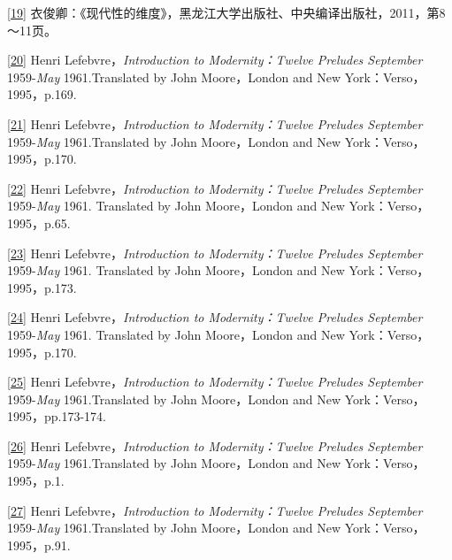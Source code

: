 \documentclass[UTF8, fontset = sourcesans, a4paper, oneside, zihao =
-4, scheme=chinese, no-math, space=true]{ctexbook}
\begin{document}
\protect\hypertarget{part0005_split_003.htmlux5cux23m19}{}{}\protect\hyperlink{part0005_split_002.htmlux5cux23w19}{{[}19{]}}
衣俊卿：《现代性的维度》，黑龙江大学出版社、中央编译出版社，2011，第8～11页。

\protect\hypertarget{part0005_split_003.htmlux5cux23m20}{}{}\protect\hyperlink{part0005_split_002.htmlux5cux23w20}{{[}20{]}}
Henri Lefebvre，\emph{Introduction to Modernity：Twelve Preludes
September} 1959-\emph{May} 1961.Translated by John Moore，London and New
York：Verso，1995，p.169.

\protect\hypertarget{part0005_split_003.htmlux5cux23m21}{}{}\protect\hyperlink{part0005_split_002.htmlux5cux23w21}{{[}21{]}}
Henri Lefebvre，\emph{Introduction to Modernity：Twelve Preludes
September} 1959-\emph{May} 1961.Translated by John Moore，London and New
York：Verso，1995，p.170.

\protect\hypertarget{part0005_split_003.htmlux5cux23m22}{}{}\protect\hyperlink{part0005_split_002.htmlux5cux23w22}{{[}22{]}}
Henri Lefebvre，\emph{Introduction to Modernity：Twelve Preludes
September} 1959-\emph{May} 1961. Translated by John Moore，London and
New York：Verso，1995，p.65.

\protect\hypertarget{part0005_split_003.htmlux5cux23m23}{}{}\protect\hyperlink{part0005_split_002.htmlux5cux23w23}{{[}23{]}}
Henri Lefebvre，\emph{Introduction to Modernity：Twelve Preludes
September} 1959-\emph{May} 1961. Translated by John Moore，London and
New York：Verso，1995，p.173.

\protect\hypertarget{part0005_split_003.htmlux5cux23m24}{}{}\protect\hyperlink{part0005_split_002.htmlux5cux23w24}{{[}24{]}}
Henri Lefebvre，\emph{Introduction to Modernity：Twelve Preludes
September} 1959-\emph{May} 1961. Translated by John Moore，London and
New York：Verso，1995，p.170.

\protect\hypertarget{part0005_split_003.htmlux5cux23m25}{}{}\protect\hyperlink{part0005_split_002.htmlux5cux23w25}{{[}25{]}}
Henri Lefebvre，\emph{Introduction to Modernity：Twelve Preludes
September} 1959-\emph{May} 1961.Translated by John Moore，London and New
York：Verso，1995，pp.173-174.

\protect\hypertarget{part0005_split_003.htmlux5cux23m26}{}{}\protect\hyperlink{part0005_split_002.htmlux5cux23w26}{{[}26{]}}
Henri Lefebvre，\emph{Introduction to Modernity：Twelve Preludes
September} 1959-\emph{May} 1961.Translated by John Moore，London and New
York：Verso，1995，p.1.

\protect\hypertarget{part0005_split_003.htmlux5cux23m27}{}{}\protect\hyperlink{part0005_split_002.htmlux5cux23w27}{{[}27{]}}
Henri Lefebvre，\emph{Introduction to Modernity：Twelve Preludes
September} 1959-\emph{May} 1961.Translated by John Moore，London and New
York：Verso，1995，p.91.
\end{document}

